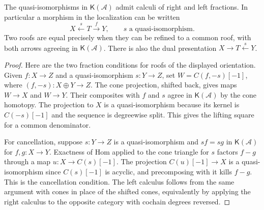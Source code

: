 \begin{theorem}\label{res:D02}
The quasi-isomorphisms in \(\mathsf K(\mathcal A)\) admit calculi of
right and left fractions. In particular a morphism in the localization
can be written
\[
 X\xleftarrow{s}T\xrightarrow{f}Y,\qquad s\text{ a quasi-isomorphism}.
\]
Two roofs are equal precisely when they can be refined to a common
roof, with both arrows agreeing in \(\mathsf K(\mathcal A)\). There is
also the dual presentation \(X\to T\xleftarrow{s}Y\).
\end{theorem}
\begin{proof}
Here are the two fraction conditions for roofs of the displayed
orientation. Given \(f:X\to Z\) and a quasi-isomorphism \(s:Y\to Z\),
set \(W=C(f,-s)[-1]\), where \((f,-s):X\oplus Y\to Z\).
The cone projection, shifted back, gives maps \(W\to X\) and \(W\to Y\).
Their composites with \(f\) and \(s\) agree in \(\mathsf K(\mathcal A)\)
by the cone homotopy. The projection to \(X\) is a quasi-isomorphism
because its kernel is \(C(-s)[-1]\) and the sequence is degreewise split.
This gives the lifting square for a common denominator.

For cancellation, suppose \(s:Y\to Z\) is a quasi-isomorphism and
\(sf=sg\) in \(\mathsf K(\mathcal A)\) for \(f,g:X\to Y\).
Exactness of Hom applied to the cone triangle for \(s\) factors \(f-g\)
through a map \(u:X\to C(s)[-1]\). The projection
\(C(u)[-1]\to X\) is a quasi-isomorphism since \(C(s)[-1]\)
is acyclic, and precomposing with it kills \(f-g\). This is the
cancellation condition. The left calculus follows from the same
argument with cones in place of the shifted cones, equivalently by
applying the right calculus to the opposite category with cochain
degrees reversed.


\end{proof}
